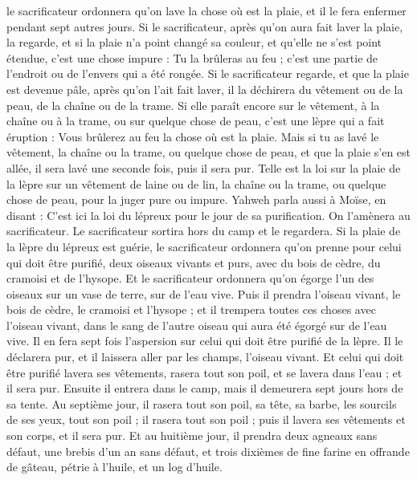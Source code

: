 \begin{multicols}{2}
le sacrificateur ordonnera qu'on lave la chose où est la plaie, et il le fera enfermer pendant sept autres jours.
Si le sacrificateur, après qu'on aura fait laver la plaie, la regarde, et si la plaie n'a point changé sa couleur, et qu'elle ne s’est point étendue, c'est une chose impure : Tu la brûleras au feu ; c’est une partie de l’endroit ou de l’envers qui a été rongée.
Si le sacrificateur regarde, et que la plaie est devenue pâle, après qu'on l'ait fait laver, il la déchirera du vêtement ou de la peau, de la chaîne ou de la trame.
Si elle paraît encore sur le vêtement, à la chaîne ou à la trame, ou sur quelque chose de peau, c'est une lèpre qui a fait éruption : Vous brûlerez au feu la chose où est la plaie.
Mais si tu as lavé le vêtement, la chaîne ou la trame, ou quelque chose de peau, et que la plaie s'en est allée, il sera lavé une seconde fois, puis il sera pur.
Telle est la loi sur la plaie de la lèpre sur un vêtement de laine ou de lin, la chaîne ou la trame, ou quelque chose de peau, pour la juger pure ou impure.
\VerseOne{}Yahweh parla aussi à Moïse, en disant :
C'est ici la loi du lépreux pour le jour de sa purification. On l’amènera au sacrificateur.
Le sacrificateur sortira hors du camp et le regardera. Si la plaie de la lèpre du lépreux est guérie,
le sacrificateur ordonnera qu'on prenne pour celui qui doit être purifié, deux oiseaux vivants et purs, avec du bois de cèdre, du cramoisi et de l'hysope.
Et le sacrificateur ordonnera qu'on égorge l'un des oiseaux sur un vase de terre, sur de l'eau vive.
Puis il prendra l’oiseau vivant, le bois de cèdre, le cramoisi et l'hysope ; et il trempera toutes ces choses avec l’oiseau vivant, dans le sang de l'autre oiseau qui aura été égorgé sur de l'eau vive.
Il en fera sept fois l’aspersion sur celui qui doit être purifié de la lèpre. Il le déclarera pur, et il laissera aller par les champs, l’oiseau vivant.
Et celui qui doit être purifié lavera ses vêtements, rasera tout son poil, et se lavera dans l'eau ; et il sera pur. Ensuite il entrera dans le camp, mais il demeurera sept jours hors de sa tente.
Au septième jour, il rasera tout son poil, sa tête, sa barbe, les sourcils de ses yeux, tout son poil ; il rasera tout son poil ; puis il lavera ses vêtements et son corps, et il sera pur.
Et au huitième jour, il prendra deux agneaux sans défaut, une brebis d'un an sans défaut, et trois dixièmes de fine farine en offrande de gâteau, pétrie à l'huile, et un log d'huile.

\end{multicols}
